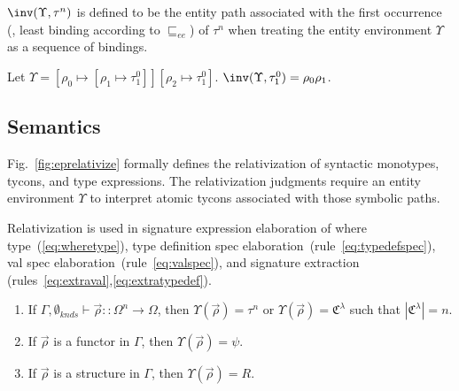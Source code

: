 \begin{definition}
$\inv(\Upsilon,\tau^n)$ is defined to be the entity path associated
with the first occurrence (\ie, least binding according to $\sqsubseteq_{ee}$) of $\tau^n$ when treating the entity environment $\Upsilon$ as a sequence of bindings. 
\end{definition}

\begin{example}
Let $\Upsilon=[\rho_0\mapsto [\rho_1\mapsto \tau^0_1]][\rho_2\mapsto \tau^0_1]$. $\inv(\Upsilon,\tau^0_1) = \rho_0\rho_1$. 
\end{example}

\subsection{Semantics}


Fig.~\ref{fig:eprelativize} formally defines the relativization of
syntactic monotypes, tycons, and type expressions. 
The relativization judgments require an
entity environment $\Upsilon$ to interpret atomic tycons associated
with those symbolic paths.

Relativization is used in signature expression elaboration of where type~(\ref{eq:wheretype}), type definition spec elaboration~(rule~\ref{eq:typedefspec}), val spec elaboration~(rule~\ref{eq:valspec}), and signature extraction (rules~\ref{eq:extraval},\ref{eq:extratypedef}). 

\begin{definition}\label{def:wellformedentenvs}
\begin{enumerate}
\item If $\Gamma,\emptyset_{knds} \vdash \vec{\rho} :: \Omega^n \to \Omega$, then $\Upsilon(\vec{\rho}) = \tau^n$ or $\Upsilon(\vec{\rho}) = \mathfrak{C}^\lambda$ such that $|\mathfrak{C}^\lambda| = n$. 

\item If $\vec{\rho}$ is a functor in $\Gamma$, then $\Upsilon(\vec{\rho}) = \psi$. 

\item If $\vec{\rho}$ is a structure in $\Gamma$, then $\Upsilon(\vec{\rho}) = R$. 
\end{enumerate}
\end{definition}


